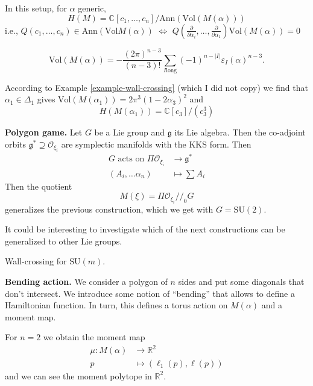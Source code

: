 \begin{theorem}
\label{theorem-Guillemin-Stenberg}
In this setup, for $\alpha$ generic,
$$
H(M)=\mathbb{C}[c_1,\ldots,c_n]/\text{Ann}
(\text{Vol}(M(\alpha)))
$$
i.e., $Q(c_1,\ldots,c_n) \in
\text{Ann}(\text{Vol}M(\alpha))$
$\iff$ $Q\left(\frac{\partial }{\partial
\alpha_i},\ldots,
\frac{\partial }{\partial \alpha_1}\right)
\text{Vol}(M(\alpha))=0$
\end{theorem}

\begin{theorem}
\label{theorem-Takakura-The-Koi}
$$
\text{Vol}(M(\alpha))
=-\frac{(2\pi)^{n-3}}{(n-3)!}
\sum_{I\text{
long}}(-1)^{n-|I|}\varepsilon_I(\alpha)^{n-3}
.
$$
\end{theorem}

\begin{example}
\label{example-Delta1}
According to Example
\ref{example-wall-crossing} (which I
did not copy) we find that
$\alpha_1 \in \Delta_1$ gives
$\text{Vol}(M(\alpha_1))=2\pi^3(1-2\alpha_3)
^2$
and
$$
H(M(\alpha_1))=\mathbb{C}[c_3]/(c_3^3)
$$
\end{example}

\medskip\noindent
{\bf Polygon game.}
Let $G$ be a Lie group and $\mathfrak{g}$ its
Lie algebra.
Then the co-adjoint orbits
$\mathfrak{g}^*  \supseteq
\mathcal{O}_{\xi_i}$
are symplectic manifolds with the KKS form.
Then
$$
\begin{aligned}
G\text{ acts on }\Pi \mathcal{O}_{\xi_i}
&\longrightarrow \mathfrak{g}^* \\
(A_i,\ldots\alpha_n) &\longmapsto \sum A_i
\end{aligned}
$$
Then the quotient
$$
M(\xi)=\Pi \mathcal{O}_{\xi_i}/\!/_0 G
$$
generalizes the previous construction,
which we get with $G=\text{SU}(2)$.

It could be interesting to investigate
which of the next constructions can be
generalized
to other Lie groups.

\begin{theorem}
\label{theorem-Sotillo}
Wall-crossing for $\text{SU}(m)$.
\end{theorem}

\medskip\noindent
{\bf Bending action.}
We consider a polygon of $n$ sides
and put some diagonals that don't intersect.
We introduce some
notion of ``bending'' that allows
to define a Hamiltonian function.
In turn, this defines a torus action on
$M(\alpha)$
and a moment map.

For $n=2$ we obtain the moment map
$$
\begin{aligned}
\mu: M(\alpha) &\longrightarrow \mathbb{R}^2
\\
p &\longmapsto (\ell_1(p),\ell(p))
\end{aligned}
$$
and we can see the moment polytope in
$\mathbb{R}^2$.


